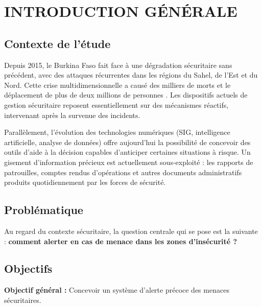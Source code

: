\documentclass[12pt,a4paper]{article}
\begin{document}
\newpage
{}
{}
\listoffigures

\newpage
{}
\setcounter{chapter}{0}
\setcounter{page}{1}

\chapter*{INTRODUCTION GÉNÉRALE}

\section*{Contexte de l'étude}
Depuis 2015, le Burkina Faso fait face à une dégradation sécuritaire sans précédent, avec des attaques récurrentes dans les régions du Sahel, de l'Est et du Nord. Cette crise multidimensionnelle a causé des milliers de morts et le déplacement de plus de deux millions de personnes \cite{zongo2020}. Les dispositifs actuels de gestion sécuritaire reposent essentiellement sur des mécanismes réactifs, intervenant après la survenue des incidents.

Parallèlement, l'évolution des technologies numériques (SIG, intelligence artificielle, analyse de données) offre aujourd'hui la possibilité de concevoir des outils d'aide à la décision capables d'anticiper certaines situations à risque. Un gisement d'information précieux est actuellement sous-exploité : les rapports de patrouilles, comptes rendus d'opérations et autres documents administratifs produits quotidiennement par les forces de sécurité.

\section*{Problématique}
Au regard du contexte sécuritaire, la question centrale qui se pose est la suivante : \textbf{comment alerter en cas de menace dans les zones d'insécurité ?}

\section*{Objectifs}
\textbf{Objectif général :} Concevoir un système d'alerte précoce des menaces sécuritaires.
\end{document}
